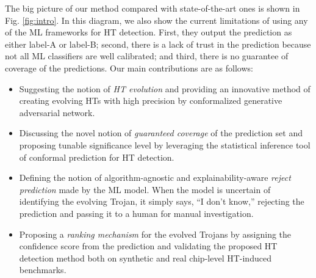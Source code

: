 The big picture of our method compared with state-of-the-art ones is shown in Fig. \ref{fig:intro}. In this diagram, we also show the current limitations of using any of the ML frameworks for HT detection. First, they output the prediction as either label-A or label-B; second, there is a lack of trust in the prediction because not all ML classifiers are well calibrated; and third, there is no guarantee of coverage of the predictions. Our main contributions are as follows:

\begin{itemize}
\item Suggesting the notion of \textit{HT evolution} and providing an innovative method of creating evolving HTs with high precision by conformalized generative adversarial network.
\item Discussing the novel notion of \textit{guaranteed coverage} of the prediction set and proposing tunable significance level by leveraging the statistical inference tool of conformal prediction for HT detection.
\item Defining the notion of algorithm-agnostic and explainability-aware \textit{reject prediction} made by the ML model. When the model is uncertain of identifying the evolving Trojan, it simply says, ``I don't know,'' rejecting the prediction and passing it to a human for manual investigation.
\item Proposing a \textit{ranking mechanism} for the evolved Trojans by assigning the confidence score from the prediction and validating the proposed HT detection method both on synthetic and real chip-level HT-induced benchmarks.
\end{itemize}


